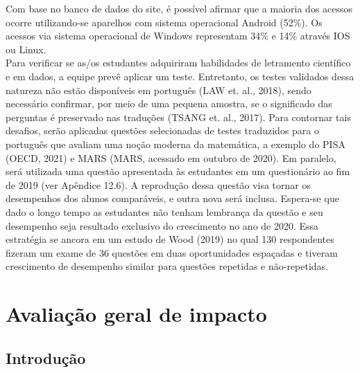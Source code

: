 \documentclass[
]{book}
\begin{document}
Com base no banco de dados do site, é possível afirmar que a maioria dos acessos ocorre utilizando-se aparelhos com sistema operacional Android (52\%). Os acessos via sistema operacional de Windows representam 34\% e 14\% através IOS ou Linux.\\
Para verificar se as/os estudantes adquiriram habilidades de letramento científico e em dados, a equipe prevê aplicar um teste. Entretanto, os testes validados dessa natureza não estão disponíveis em português (LAW et. al., 2018), sendo necessário confirmar, por meio de uma pequena amostra, se o significado das perguntas é preservado nas traduções (TSANG et. al., 2017).
Para contornar tais desafios, serão aplicadas questões selecionadas de testes traduzidos para o português que avaliam uma noção moderna da matemática, a exemplo do PISA (OECD, 2021) e MARS (MARS, acessado em outubro de 2020). Em paralelo, será utilizada uma questão apresentada às estudantes em um questionário ao fim de 2019 (ver Apêndice 12.6). A reprodução dessa questão visa tornar os desempenhos dos alunos comparáveis, e outra nova será inclusa. Espera-se que dado o longo tempo as estudantes não tenham lembrança da questão e seu desempenho seja resultado exclusivo do crescimento no ano de 2020. Essa estratégia se ancora em um estudo de Wood (2019) no qual 130 respondentes fizeram um exame de 36 questões em duas oportunidades espaçadas e tiveram crescimento de desempenho similar para questões repetidas e não-repetidas.

\hypertarget{avaliauxe7uxe3o-geral-de-impacto}{%
\chapter{Avaliação geral de impacto}\label{avaliauxe7uxe3o-geral-de-impacto}}

\hypertarget{introduuxe7uxe3o}{%
\section{Introdução}\label{introduuxe7uxe3o}}
\end{document}
